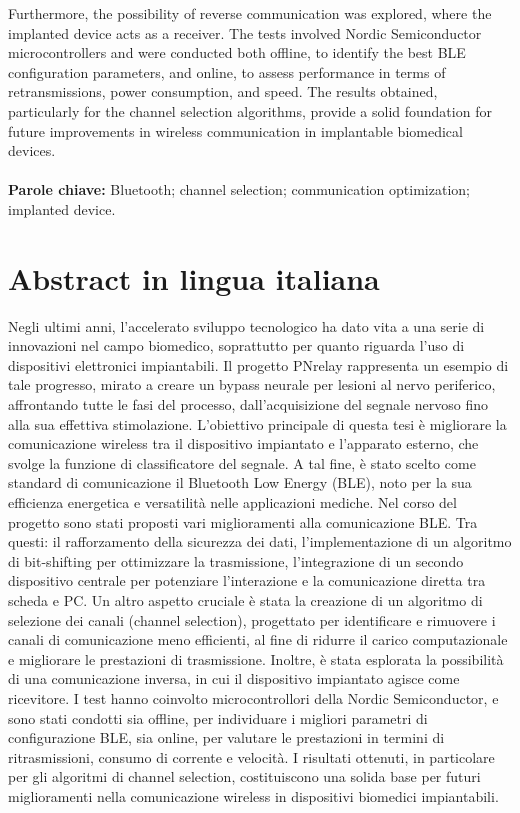 \documentclass{Configuration_Files/PoliMi3i_thesis}
\begin{document}
Furthermore, the possibility of reverse communication was explored, where the implanted device acts as a receiver. The tests involved Nordic Semiconductor microcontrollers and were conducted both offline, to identify the best BLE configuration parameters, and online, to assess performance in terms of retransmissions, power consumption, and speed. The results obtained, particularly for the channel selection algorithms, provide a solid foundation for future improvements in wireless communication in implantable biomedical devices.
\\
\\
\textbf{Parole chiave:} Bluetooth; channel selection; communication optimization; implanted device.

\chapter*{Abstract in lingua italiana}
Negli ultimi anni, l’accelerato sviluppo tecnologico ha dato vita a una serie di innovazioni nel campo biomedico, soprattutto per quanto riguarda l'uso di dispositivi elettronici impiantabili. Il progetto PNrelay rappresenta un esempio di tale progresso, mirato a creare un bypass neurale per lesioni al nervo periferico, affrontando tutte le fasi del processo, dall'acquisizione del segnale nervoso fino alla sua effettiva stimolazione. L’obiettivo principale di questa tesi è migliorare la comunicazione wireless tra il dispositivo impiantato e l'apparato esterno, che svolge la funzione di classificatore del segnale. A tal fine, è stato scelto come standard di comunicazione il Bluetooth Low Energy (BLE), noto per la sua efficienza energetica e versatilità nelle applicazioni mediche.
Nel corso del progetto sono stati proposti vari miglioramenti alla comunicazione BLE. Tra questi: il rafforzamento della sicurezza dei dati, l’implementazione di un algoritmo di bit-shifting per ottimizzare la trasmissione, l'integrazione di un secondo dispositivo centrale per potenziare l'interazione e la comunicazione diretta tra scheda e PC. Un altro aspetto cruciale è stata la creazione di un algoritmo di selezione dei canali (channel selection), progettato per identificare e rimuovere i canali di comunicazione meno efficienti, al fine di ridurre il carico computazionale e migliorare le prestazioni di trasmissione.
Inoltre, è stata esplorata la possibilità di una comunicazione inversa, in cui il dispositivo impiantato agisce come ricevitore. I test hanno coinvolto microcontrollori della Nordic Semiconductor, e sono stati condotti sia offline, per individuare i migliori parametri di configurazione BLE, sia online, per valutare le prestazioni in termini di ritrasmissioni, consumo di corrente e velocità. I risultati ottenuti, in particolare per gli algoritmi di channel selection, costituiscono una solida base per futuri miglioramenti nella comunicazione wireless in dispositivi biomedici impiantabili.
\end{document}
